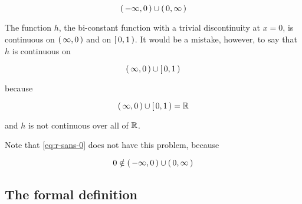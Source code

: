 \begin{equation}
    \label{eq:r-sans-0-interval-notation}
    \label{eq:r-sans-0}
    \left(\, -\infty, 0 \,\right) \cup \left(\, 0, \infty \,\right)
\end{equation}

The function $h$, the bi-constant function with a trivial discontinuity at $x =
0$, is continuous on $\left(\, \infty,0 \,\right)$ and on $\left[\, 0, 1 \,\right)$. It would be a
mistake, however, to say that $h$ is continuous on

\begin{equation}
    \left(\, \infty, 0 \,\right) \cup \left[\, 0, 1 \,\right)
\end{equation}

because 

\begin{equation}
    \left(\, \infty, 0 \,\right) \cup \left[\, 0, 1 \,\right) = \mathbb{R}
\end{equation}

and $h$ is not continuous over all of $\mathbb{R}$.

Note that \cref{eq:r-sans-0} does not have this problem, because

\begin{equation}
    0 \notin \left(\, -\infty, 0 \,\right) \cup \left(\, 0, \infty \,\right)
\end{equation}

\subsection{The formal definition}

\begin{appendices}
\end{appendices}